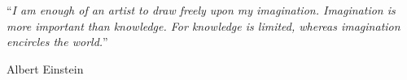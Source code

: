 
\vspace*{0.2\textheight}

\noindent\enquote{\itshape I am enough of an artist to draw freely upon my imagination. Imagination is more important than knowledge. For knowledge is limited, whereas imagination encircles the world.}\bigbreak

\hfill Albert Einstein
